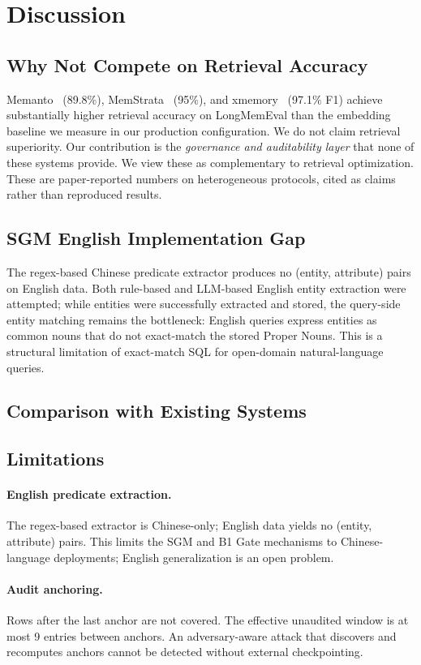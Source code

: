 \documentclass{article}
\begin{document}
\section{Discussion}
\label{sec:crosssys}
\label{sec:disc}

\subsection{Why Not Compete on Retrieval Accuracy}
Memanto~\citep{memanto} (89.8\%), MemStrata~\citep{memstrata} (95\%), and xmemory~\citep{xmemory} (97.1\% F1) achieve substantially higher retrieval accuracy on LongMemEval than the embedding baseline we measure in our production configuration. We do not claim retrieval superiority. Our contribution is the \emph{governance and auditability layer} that none of these systems provide. We view these as complementary to retrieval optimization. These are paper-reported numbers on heterogeneous protocols, cited as claims rather than reproduced results.

\subsection{SGM English Implementation Gap}
The regex-based Chinese predicate extractor produces no (entity, attribute) pairs on English data. Both rule-based and LLM-based English entity extraction were attempted; while entities were successfully extracted and stored, the query-side entity matching remains the bottleneck: English queries express entities as common nouns that do not exact-match the stored Proper Nouns. This is a structural limitation of exact-match SQL for open-domain natural-language queries.
\subsection{Comparison with Existing Systems}


\subsection{Limitations}
\paragraph{English predicate extraction.} The regex-based extractor is Chinese-only; English data yields no (entity, attribute) pairs. This limits the SGM and B1 Gate mechanisms to Chinese-language deployments; English generalization is an open problem.
\paragraph{Audit anchoring.} Rows after the last anchor are not covered. The effective unaudited window is at most 9 entries between anchors. An adversary-aware attack that discovers and recomputes anchors cannot be detected without external checkpointing.
\end{document}
